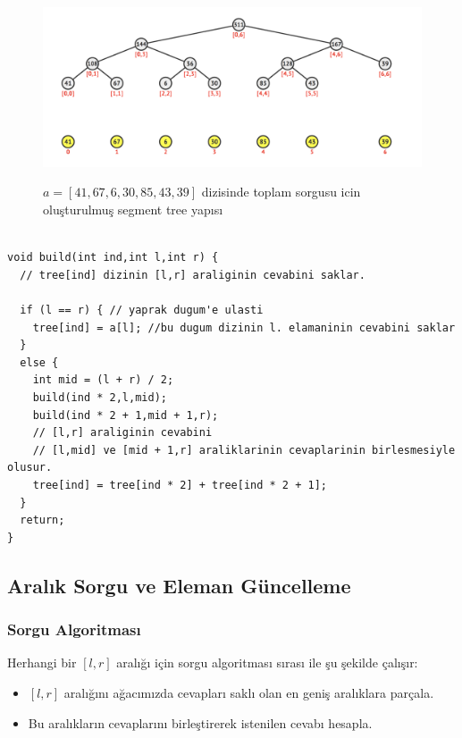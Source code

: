 \documentclass[12pt]{article}
\begin{document}
	\begin{figure}[h]
		\centering
		\includegraphics[width=\linewidth/1]{segtree.png}
		\label{fig:segtree}
        \caption{
        $a = [41,67,6,30,85,43,39]$ dizisinde toplam sorgusu icin olu\c{s}turulmu\c{s} segment tree yap{\i}s{\i}}
	\end{figure}
	
	\clearpage
	
    \begin{verbatim}

void build(int ind,int l,int r) {
  // tree[ind] dizinin [l,r] araliginin cevabini saklar.

  if (l == r) { // yaprak dugum'e ulasti
    tree[ind] = a[l]; //bu dugum dizinin l. elamaninin cevabini saklar
  }
  else {
    int mid = (l + r) / 2;
    build(ind * 2,l,mid);
    build(ind * 2 + 1,mid + 1,r);
    // [l,r] araliginin cevabini
    // [l,mid] ve [mid + 1,r] araliklarinin cevaplarinin birlesmesiyle olusur.
    tree[ind] = tree[ind * 2] + tree[ind * 2 + 1];
  }
  return;
}

    \end{verbatim}
    
    \subsection{Aral{\i}k Sorgu ve Eleman G\"{u}ncelleme}
    
    \subsubsection{Sorgu Algoritmas{\i}}
    
    Herhangi bir $[l,r]$ aral{\i}\u{g}{\i} i\c{c}in sorgu algoritmas{\i} s{\i}ras{\i} ile \c{s}u \c{s}ekilde \c{c}al{\i}\c{s}{\i}r:
    
    \begin{itemize}
        
        \item $[l,r]$ aral{\i}\u{g}{\i}n{\i} a\u{g}ac{\i}m{\i}zda cevaplar{\i} sakl{\i} olan en geni\c{s} aral{\i}klara  par\c{c}ala.
        
        \item Bu aral{\i}klar{\i}n cevaplar{\i}n{\i} birle\c{s}tirerek istenilen cevab{\i} hesapla.
    
    \end{itemize}
\end{document}
